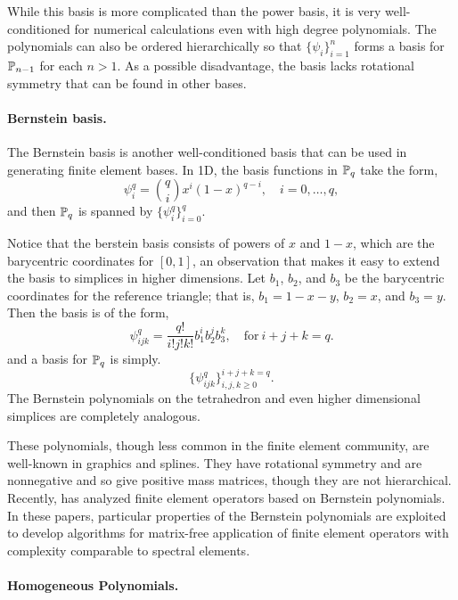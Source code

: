 While this basis is more complicated than the power basis, it is very
well-conditioned for numerical calculations even with high degree
polynomials.  The polynomials can also be ordered hierarchically so
that
\( \{ \psi_i \}_{i=1}^{n} \) forms a basis for $\P_{n-1}$ 
for each \( n > 1 \).  As a possible disadvantage, the
basis lacks rotational symmetry that can be found in  other bases.

\paragraph{Bernstein basis.}
The Bernstein basis is another well-conditioned basis that can be
used in generating finite element bases.
In 1D, the  basis functions in $\P_q$ take the form,
\begin{equation}
\psi_i^q = \binom{q}{i} x^i (1-x)^{q-i}, \quad i=0,\ldots,q,
\end{equation}
and then \( \P_q \) is spanned by \( \{ \psi_i^q \}_{i=0}^q \).

Notice that the berstein basis consists of powers of \( x \) and \( 1-x \),  which are the
barycentric coordinates for \( [0,1] \), an observation that makes it
easy to extend the basis to simplices in higher dimensions.
Let $b_1$, $b_2$, and $b_3$ be the barycentric coordinates for
the reference triangle; that is,
$b_1=1-x-y$, $b_2=x$, and $b_3=y$. Then the basis is
of the form,
\begin{equation}
\psi_{ijk}^q = \frac{q!}{i!j!k!} b_1^i b_2^j b_3^k, \quad  \mbox{for} \ i+j+k=q .
\end{equation}
and a basis for $\P_q$ is simply.
\begin{equation}
\{ \psi_{ijk}^q \}_{i,j,k\geq 0}^{i+j+k = q} .
\end{equation}
The Bernstein polynomials on the tetrahedron and even higher
dimensional simplices are completely analogous.

These polynomials, though less common in the finite element community,
are well-known in graphics and splines.  They have 
rotational symmetry and are nonnegative and so give positive
mass matrices, though they are not hierarchical.
Recently, \citet{Kirby2009,Kirby2010} has analyzed finite element operators based on Bernstein
polynomials.  In these papers, particular properties of the Bernstein
polynomials are exploited to develop algorithms for matrix-free
application of finite element operators with complexity comparable to
spectral elements.


\paragraph{Homogeneous Polynomials.}
\label{sec:homo:pol}

